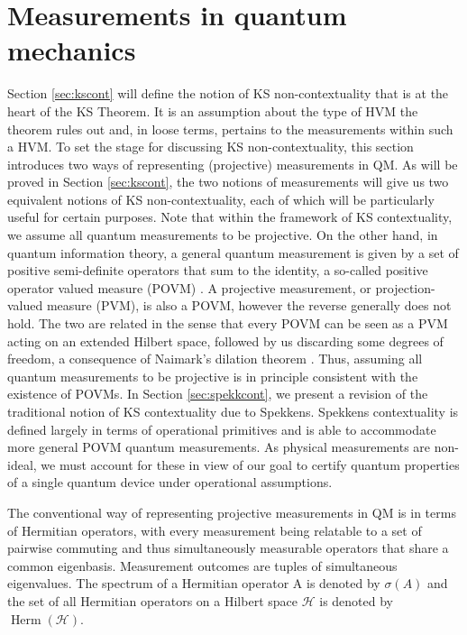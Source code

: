 \section{Measurements in quantum mechanics}
\label{sec:mnts}
Section \ref{sec:kscont} will define the notion of KS non-contextuality that is at the heart of the KS Theorem. It is an assumption about the type of HVM the theorem rules out and, in loose terms, pertains to the measurements within such a HVM. To set the stage for discussing KS non-contextuality, this section introduces two ways of representing (projective) measurements in QM. As will be proved in Section \ref{sec:kscont}, the two notions of measurements will give us two equivalent notions of KS non-contextuality, each of which will be particularly useful for certain purposes. Note that within the framework of KS contextuality, we assume all quantum measurements to be projective. On the other hand, in quantum information theory, a general quantum measurement is given by a set of positive semi-definite operators that sum to the identity, a so-called positive operator valued measure (POVM) \cite{Nielsen2010}. A projective measurement, or projection-valued measure (PVM), is also a POVM, however the reverse generally does not hold. The two are related in the sense that every POVM can be seen as a PVM acting on an extended Hilbert space, followed by us discarding some degrees of freedom, a consequence of Naimark's dilation theorem \cite{Watrous2018}. Thus, assuming all quantum measurements to be projective is in principle consistent with the existence of POVMs. In Section \ref{sec:spekkcont}, we present a revision of the traditional notion of KS contextuality due to Spekkens. Spekkens contextuality is defined largely in terms of operational primitives and is able to accommodate more general POVM quantum measurements. As physical measurements are non-ideal, we must account for these in view of our goal to certify quantum properties of a single quantum device under operational assumptions.

The conventional way of representing projective measurements in QM is in terms of Hermitian operators, with every measurement being relatable to a set of pairwise commuting and thus simultaneously measurable operators that share a common eigenbasis. Measurement outcomes are tuples of simultaneous eigenvalues. The spectrum of a Hermitian operator A is denoted by $\sigma(A)$ and the set of all Hermitian operators on a Hilbert space $\mathcal{H}$ is denoted by $\operatorname{Herm}(\mathcal{H})$. 

